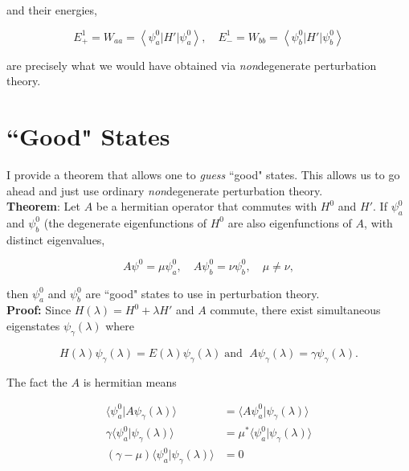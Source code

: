 \documentclass[svgnames]{article}     %
\begin{document}
and their energies, 

\[
  E_+^{1} = W_{aa} = \left\langle \psi_a^{0} | H' | \psi_a^{0} \right\rangle,
  \quad E_-^{1} = W_{bb} = \left\langle \psi_b^{0} | H' | \psi_b^{0}
    \right\rangle
\] \vspace{3px}

are precisely what we would have obtained via \textit{non}degenerate
perturbation theory. 

\section{``Good" States} 

I provide a theorem that allows one to \textit{guess} ``good" states. This
allows us to go ahead and just use ordinary \textit{non}degenerate perturbation
theory. \\

\noindent 
\textbf{Theorem}: Let $A$ be a hermitian operator that commutes with $H^{0}$
and $H'$. If $\psi_a^{0}$ and $\psi_b^{0}$ (the degenerate eigenfunctions of
$H^{0}$ are also eigenfunctions of $A$, with distinct eigenvalues, 

\[
A\psi^{0} = \mu \psi_a^{0}, \quad A\psi_b^{0} = \nu \psi_b^{0}, \quad \mu \neq
\nu,
\] \vspace{3px}

\noindent 
then $\psi_a^{0}$ and $\psi_b^{0}$ are ``good" states to use in perturbation
theory. \\

\noindent \textbf{Proof:} Since $H(\lambda) = H^{0} + \lambda H'$ and $A$
commute, there exist simultaneous eigenstates  $\psi_\gamma(\lambda)$ where 

\[
H(\lambda) \psi_\gamma (\lambda) = E(\lambda) \psi_\gamma(\lambda) \; \text{
and } \; A \psi_\gamma (\lambda) = \gamma \psi_\gamma (\lambda).
\] \vspace{3px}

The fact the $A$ is hermitian means

\begin{align*}
  \langle \psi_a^{0} | A \psi_\gamma (\lambda) \rangle &= \langle A \psi_a^{0}
  | \psi_\gamma(\lambda) \rangle  \\[5px]
  \gamma \langle  \psi_a^{0} | \psi_\gamma
  (\lambda) \rangle &= \mu^* \langle \psi_a^{0} | \psi_\gamma(\lambda) \rangle
  \\[5px] 
  (\gamma - \mu) \langle \psi_a^{0} | \psi_\gamma(\lambda) \rangle &= 0 
\end{align*}
\end{document}
